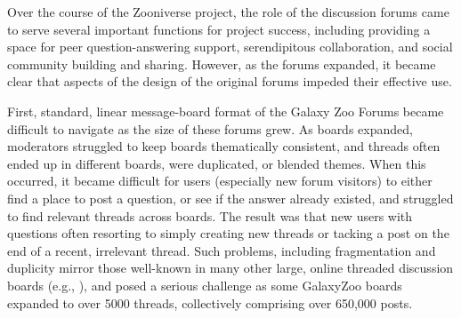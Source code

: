 \documentclass{sigchi}
\begin{document}


Over the course of the Zooniverse project, the role of the discussion forums came to serve several important functions for project success, including providing a space for peer question-answering support, serendipitous collaboration, and social community building and sharing. However, as the forums expanded, it became clear that aspects of the design of the original forums impeded their effective use.   

First, standard, linear message-board format of the Galaxy Zoo Forums became difficult to navigate as the size of these forums grew.  As boards expanded, moderators struggled to keep boards thematically consistent, and threads often ended up in different boards, were duplicated, or blended themes.  When this occurred, it became difficult for users (especially new forum visitors) to either find a place to post a question, or see if the answer already existed, and struggled to find relevant threads across boards.  The result was that new users with questions often resorting to simply creating new threads or tacking a post on the end of a recent, irrelevant thread.  Such problems, including fragmentation and duplicity mirror those well-known  in many other large, online threaded discussion boards (e.g., \cite{murphy2004graduate}), and posed a serious challenge as some GalaxyZoo boards expanded to over 5000 threads, collectively comprising over 650,000 posts. 
\end{document}
